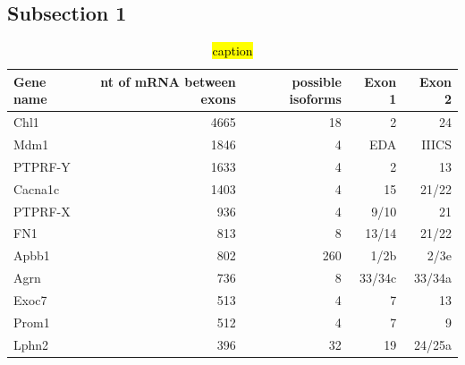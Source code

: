 \subsection{Subsection 1}

\begin{table}[h]
\begin{tabular}{|l|r|r|r|r|}
\hline
\textbf{Gene name} & \textbf{nt of mRNA between exons} & \textbf{possible isoforms} & \textbf{Exon 1} & \textbf{Exon 2} \\ \hline
Chl1               & 4665                              & 18                         & 2               & 24              \\ \hline
Mdm1               & 1846                              & 4                          & EDA             & IIICS           \\ \hline
PTPRF-Y            & 1633                              & 4                          & 2               & 13              \\ \hline
Cacna1c            & 1403                              & 4                          & 15              & 21/22           \\ \hline
PTPRF-X            & 936                               & 4                          & 9/10            & 21              \\ \hline
FN1                & 813                               & 8                          & 13/14           & 21/22           \\ \hline
Apbb1              & 802                               & 260                        & 1/2b            & 2/3e            \\ \hline
Agrn               & 736                               & 8                          & 33/34c          & 33/34a          \\ \hline
Exoc7              & 513                               & 4                          & 7               & 13              \\ \hline
Prom1              & 512                               & 4                          & 7               & 9               \\ \hline
Lphn2              & 396                               & 32                         & 19              & 24/25a          \\ \hline
\end{tabular}
  \caption[Genes with big spans in between]{\hl{caption}}
  \label{BigSpanGenes}
\end{table}

